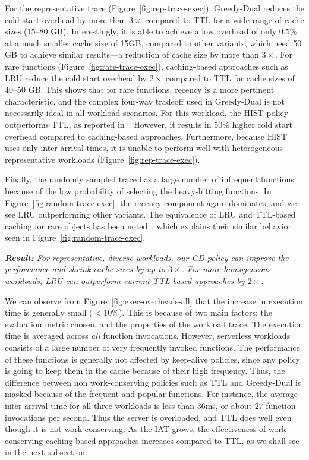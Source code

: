 For the representative trace (Figure~\ref{fig:rep-trace-exec}), Greedy-Dual reduces the cold start overhead by more than $3\times$ compared to TTL for a wide range of cache sizes (15--80 GB). 
Interestingly, it is able to achieve a low overhead of only 0.5\% at a much smaller cache size of 15GB, compared to other variants, which need 50 GB to achieve similar results---a reduction of cache size by more than $3\times$. 
%
For rare functions (Figure~\ref{fig:rare-trace-exec}), caching-based approaches such as LRU  reduce the cold start overhead by $2\times$ compared to TTL for cache sizes of 40--50 GB. 
This shows that for rare functions, recency is a more pertinent characteristic, and the complex four-way tradeoff used in Greedy-Dual is not necessarily ideal in all workload scenarios. 
For this workload, the HIST policy outperforms TTL, as reported in~\cite{shahrad_serverless_2020}. 
However, it results in 50\% higher cold start overhead compared to caching-based approaches.
Furthermore, because HIST uses only inter-arrival times, it is unable to perform well with heterogeneous representative workloads  (Figure~\ref{fig:rep-trace-exec}). 


Finally, the randomly sampled trace has a large number of infrequent functions because of the low probability of selecting the heavy-hitting functions.
In Figure~\ref{fig:random-trace-exec}, the recency component again dominates, and we see LRU outperforming other variants. 
The equivalence of LRU and TTL-based caching for rare objects has been noted~\cite{basu2017adaptive,jiang2018convergence}, which explains their similar behavior seen in Figure~\ref{fig:random-trace-exec}. 


\noindent \emph{\textbf{Result:} For representative, diverse workloads, our GD policy can improve the performance and shrink cache sizes by up to $3\times$. For more homogeneous workloads, LRU can outperform current TTL-based approaches by $2\times$.}

We can observe from Figure~\ref{fig:exec-overheads-all} that the increase in execution time is generally small ($<10\%$).
This is because of two main factors: the evaluation metric chosen, and the properties of the workload trace. 
The execution time is averaged across \emph{all} function invocations.
However, serverless workloads consists of a large number of very frequently invoked functions. 
The performance of these functions is generally not affected by keep-alive policies, since any policy is going to keep them in the cache because of their high frequency. 
Thus, the difference between non work-conserving policies such as TTL and Greedy-Dual is masked because of the frequent and popular functions. 
For instance, the average inter-arrival time for all three workloads is less than 36ms, or about 27 function invocations per second. 
Thus the server is overloaded, and TTL does well even though it is not work-conserving. 
As the IAT grows, the effectiveness of work-conserving caching-based approaches increases compared to TTL, as we shall see in the next subsection. 

